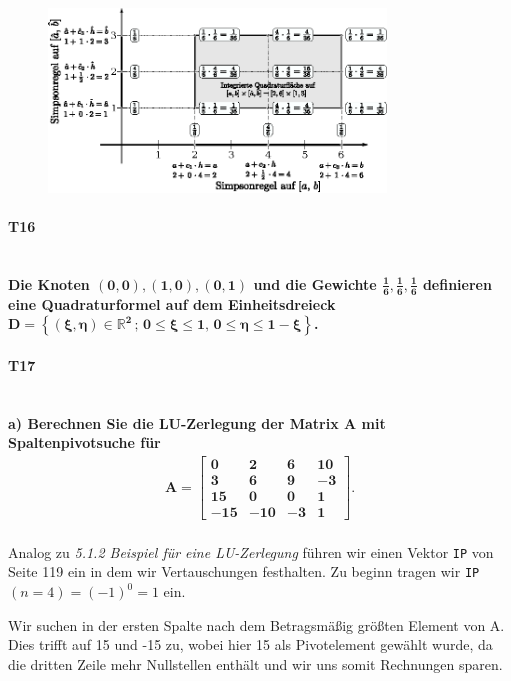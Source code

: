 \documentclass[10pt,a4paper]{article}
\begin{document}
	\begin{figure}[htbp]
		\centering
		\includegraphics[width=0.8\textwidth]{T15.eps}
	\end{figure}
	\newpage
	\paragraph{T16}\mbox{}\\
	\textbf{%
	Die Knoten $\mathbf{(0,0), (1,0), (0,1)}$ und die Gewichte $\mathbf{\frac{1}{6},\frac{1}{6},\frac{1}{6}}$ definieren eine Quadraturformel auf dem Einheitsdreieck $\mathbf{D=\left\lbrace (\xi,\eta) \in \mathbb{R}^2 \,;\, 0\leq\xi\leq 1,\, 0\leq\eta \leq1-\xi \right\rbrace}$.
	}
	\newpage
	\paragraph{T17}\mbox{}\\
	\textbf{%
		a) Berechnen Sie die LU-Zerlegung der Matrix A mit Spaltenpivotsuche für
		\begin{align*}\mathbf{
			A= \begin{bmatrix}
				0   & 2   & 6  & 10 \\
				3   & 6   & 9  & -3 \\
				15  & 0   & 0  & 1  \\
				-15 & -10 & -3 & 1
			\end{bmatrix}.}
		\end{align*}
	}\\
    Analog zu \emph{5.1.2 Beispiel für eine LU-Zerlegung} führen wir einen Vektor \texttt{IP} von Seite 119 ein in dem wir Vertauschungen festhalten. Zu beginn tragen wir \texttt{IP}$(n=4)=(-1)^0=1$ ein.
    
    Wir suchen in der ersten Spalte nach dem Betragsmäßig größten Element von A. Dies trifft auf 15 und -15 zu, wobei hier 15 als Pivotelement gewählt wurde, da die dritten Zeile mehr Nullstellen enthält und wir uns somit Rechnungen sparen.
    
\end{document}
